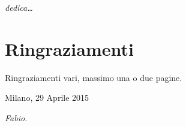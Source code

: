 \begin{flushright}
\Large\textit{dedica\dots}
\end{flushright}

\cleardoublepage

\thispagestyle{empty}

\chapter*{Ringraziamenti}
Ringraziamenti vari, massimo una o due pagine.

\begin{flushleft}
Milano, 29 Aprile 2015
\end{flushleft}

\begin{flushright}
\emph{Fabio.}
\end{flushright}

\cleardoublepage
